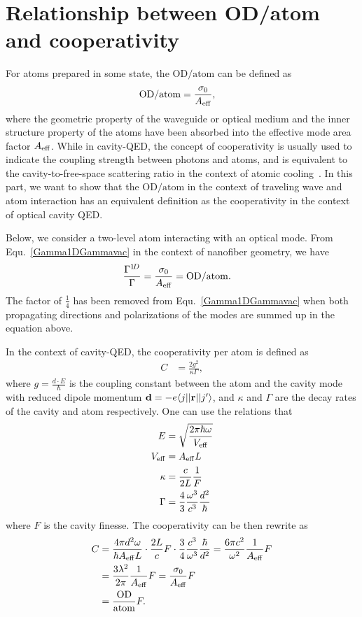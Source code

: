 \section{Relationship between OD/atom and cooperativity}
For atoms prepared in some state, the $\mathrm{OD}/\mathrm{atom}$ can be defined as
\begin{align}
\mathrm{OD}/\mathrm{atom} &= \frac{\sigma_0 }{A_{\rm eff} }, 
\end{align}
where the geometric property of the waveguide or optical medium and the inner structure property of the atoms have been absorbed into the effective mode area factor $ A_{\rm eff} $. 
While in cavity-QED, the concept of cooperativity is usually used to indicate the coupling strength between photons and atoms, and is equivalent to the cavity-to-free-space scattering ratio in the context of atomic cooling~\cite{Tanji-Suzukia2011,Vuletic2000,Kimble1998}. 
In this part, we want to show that the  $\mathrm{OD}/\mathrm{atom}$ in the context of traveling wave and atom interaction has an equivalent definition as the cooperativity in the context of optical cavity QED. 

Below, we consider a two-level atom interacting with an optical mode. 
From Equ.~\ref{Gamma1DGammavac} in the context of nanofiber geometry, we have
\begin{align}
\frac{\Gamma^{1\!D}}{\Gamma} &=   \frac{\sigma_0}{A_{\rm eff}}= \mathrm{OD}/\mathrm{atom}.
\end{align} 
The factor of $ \frac{1}{4} $ has been removed from Equ.~\ref{Gamma1DGammavac} when both propagating directions and polarizations of the modes are summed up in the equation above.

In the context of cavity-QED, the cooperativity per atom is defined as 
\begin{align}
C &= \frac{2 g^2}{\kappa \Gamma},
\end{align}
where $ g=\frac{d\cdot E}{\hbar} $ is the coupling constant between the atom and the cavity mode with reduced dipole momentum $ \mathbf{d}=-e\langle{j}\rvert|\mathbf{r}|\lvert{j'}\rangle $, and $ \kappa  $ and $ \Gamma $ are the decay rates of the cavity and atom respectively. 
One can use the relations that 
\begin{align}
E &= \sqrt{\frac{2\pi\hbar \omega}{V_{\rm eff}}}\\
V_{\rm eff} &= A_{\rm eff} L\\
\kappa &= \frac{c}{2L} \frac{1}{F}\\
\Gamma &= \frac{4}{3}\frac{\omega^3}{c^3} \frac{d^2}{\hbar}
\end{align}
where $ F $ is the cavity finesse.
The cooperativity can be then rewrite as
\begin{align}
C &= \frac{4\pi d^2 \omega}{\hbar A_{\rm eff}L}\cdot  \frac{2L}{c}F \cdot \frac{3}{4} \frac{c^3}{\omega^3} \frac{\hbar}{d^2} = \frac{6\pi c^2}{\omega^2} \frac{1}{A_{\rm eff}} F\\
&= \frac{3\lambda^2}{2\pi} \frac{1}{A_{\rm eff}} F = \frac{\sigma_0}{A_{\rm eff}} F\\
&= \frac{\mathrm{OD}}{\mathrm{atom}} F.
\end{align}


